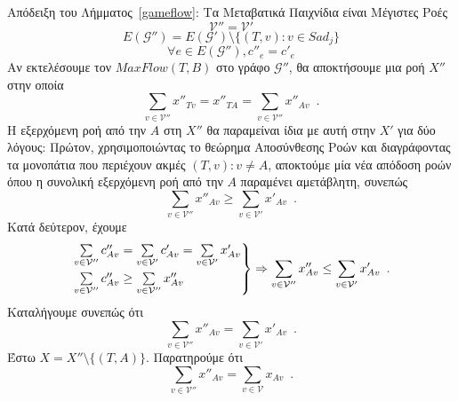 \begin{sepproof}{Απόδειξη του Λήμματος~\ref{gameflow}: Τα Μεταβατικά Παιχνίδια είναι Μέγιστες Ροές}
  \begin{equation*}
    \mathcal{V}'' = \mathcal{V}'
  \end{equation*}
  \begin{equation*}
    E(\mathcal{G}'') = E(\mathcal{G}') \setminus \{(T, v) : v \in Sad_j\}
  \end{equation*}
  \begin{equation*}
    \forall e \in E(\mathcal{G}''), c''_e = c'_e
  \end{equation*}
  Αν εκτελέσουμε τον $MaxFlow\left(T, B\right)$ στο γράφο $\mathcal{G}''$, θα αποκτήσουμε μια ροή $X''$ στην οποία
  \begin{equation*}
    \sum\limits_{v \in \mathcal{V}''}x''_{Tv} = x''_{TA} = \sum\limits_{v \in \mathcal{V}''}x''_{Av} \enspace.
  \end{equation*}
  Η εξερχόμενη ροή από την $A$ στη $X''$ θα παραμείναι ίδια με αυτή στην $X'$ για δύο λόγους: Πρώτον, χρησιμοποιώντας το
  θεώρημα Αποσύνθεσης Ροών \cite{amo} και διαγράφοντας τα μονοπάτια που περιέχουν ακμές $\left(T, v\right): v \neq A$,
  αποκτούμε μία νέα απόδοση ροών όπου η συνολική εξερχόμενη ροή από την $A$ παραμένει αμετάβλητη, συνεπώς
  \begin{equation*}
    \sum\limits_{v \in \mathcal{V}''}x''_{Av} \geq \sum\limits_{v \in \mathcal{V}'}x'_{Av} \enspace.
  \end{equation*}
  Κατά δεύτερον, έχουμε
  \begin{equation*}
    \begin{rcases}
      \sum\limits_{v \in \mathcal{V}''}c''_{Av} = \sum\limits_{v \in \mathcal{V}'}c'_{Av} = \sum\limits_{v \in
      \mathcal{V}'}x'_{Av} \\
      \sum\limits_{v \in \mathcal{V}''}c''_{Av} \geq \sum\limits_{v \in \mathcal{V}''}x''_{Av}
    \end{rcases}
    \Rightarrow \sum\limits_{v \in \mathcal{V}''}x''_{Av} \leq \sum\limits_{v \in \mathcal{V}'}x'_{Av} \enspace.
  \end{equation*}
  Καταλήγουμε συνεπώς ότι
  \begin{equation}
  \label{primeequaldoubleprime}
    \sum\limits_{v \in \mathcal{V}''}x''_{Av} = \sum\limits_{v \in \mathcal{V}'}x'_{Av} \enspace.
  \end{equation}
  Έστω $X = X'' \setminus \{\left(T, A\right)\}$. Παρατηρούμε ότι
  \begin{equation*}
    \sum\limits_{v \in \mathcal{V}''}x''_{Av} = \sum\limits_{v \in \mathcal{V}}x_{Av} \enspace.
  \end{equation*}

\end{sepproof}
